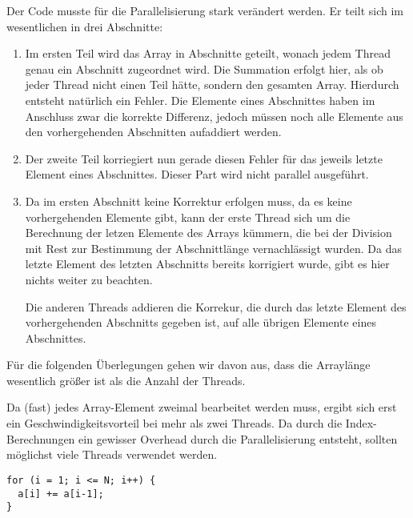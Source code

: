 Der Code musste für die Parallelisierung stark verändert werden. Er teilt sich
im wesentlichen in drei Abschnitte:
\begin{enumerate}
 \item Im ersten Teil wird das Array in Abschnitte geteilt, wonach jedem Thread
       genau ein Abschnitt zugeordnet wird. Die Summation erfolgt hier, als ob
       jeder Thread nicht einen Teil hätte, sondern den gesamten Array. Hierdurch
       entsteht natürlich ein Fehler. Die Elemente eines Abschnittes haben im
       Anschluss zwar die korrekte Differenz, jedoch müssen noch alle Elemente aus
       den vorhergehenden Abschnitten aufaddiert werden.
 \item Der zweite Teil korriegiert nun gerade diesen Fehler für das jeweils letzte
       Element eines Abschnittes. Dieser Part wird nicht parallel ausgeführt.
 \item Da im ersten Abschnitt keine Korrektur erfolgen muss, da es keine vorhergehenden
       Elemente gibt, kann der erste Thread sich um die Berechnung der letzen
       Elemente des Arrays kümmern, die bei der Division mit Rest zur Bestimmung
       der Abschnittlänge vernachlässigt wurden. Da das letzte Element des letzten
       Abschnitts bereits korrigiert wurde, gibt es hier nichts weiter zu beachten.

       Die anderen Threads addieren die Korrekur, die durch das letzte Element
       des vorhergehenden Abschnitts gegeben ist, auf alle übrigen Elemente eines
       Abschnittes.
\end{enumerate}

Für die folgenden Überlegungen gehen wir davon aus, dass die Arraylänge wesentlich
größer ist als die Anzahl der Threads.

Da (fast) jedes Array-Element zweimal bearbeitet werden muss, ergibt sich erst ein
Geschwindigkeitsvorteil bei mehr als zwei Threads. Da durch die Index-Berechnungen
ein gewisser Overhead durch die Parallelisierung entsteht, sollten möglichst viele
Threads verwendet werden.



\begin{lstlisting}[caption=Original-Code,label=lst:code3_orig]
for (i = 1; i <= N; i++) {
  a[i] += a[i-1];
}
\end{lstlisting}

